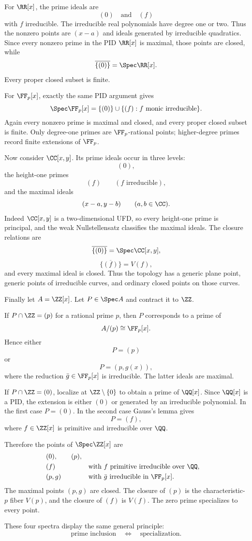 \begin{solution}
For $\RR[x]$, the prime ideals are
\[
(0)
\quad\text{and}\quad
(f)
\]
with $f$ irreducible.  The irreducible real polynomials have degree one or two.  Thus the
nonzero points are $(x-a)$ and ideals generated by irreducible quadratics.  Since every
nonzero prime in the PID $\RR[x]$ is maximal, those points are closed, while
\[
\overline{\{(0)\}}=\Spec\RR[x].
\]
Every proper closed subset is finite.

For $\FF_p[x]$, exactly the same PID argument gives
\[
\Spec\FF_p[x]=\{(0)\}\cup\{(f):f\text{ monic irreducible}\}.
\]
Again every nonzero prime is maximal and closed, and every proper closed subset is finite.
Only degree-one primes are $\FF_p$-rational points; higher-degree primes record finite
extensions of $\FF_p$.

Now consider $\CC[x,y]$.  Its prime ideals occur in three levels:
\[
(0),
\]
the height-one primes
\[
(f)\qquad(f\text{ irreducible}),
\]
and the maximal ideals
\[
(x-a,y-b)\qquad(a,b\in\CC).
\]
Indeed $\CC[x,y]$ is a two-dimensional UFD, so every height-one prime is principal, and the
weak Nullstellensatz classifies the maximal ideals.  The closure relations are
\[
\overline{\{(0)\}}=\Spec\CC[x,y],
\]
\[
\overline{\{(f)\}}=V(f),
\]
and every maximal ideal is closed.  Thus the topology has a generic plane point, generic
points of irreducible curves, and ordinary closed points on those curves.

Finally let $A=\ZZ[x]$.  Let $P\in\Spec A$ and contract it to $\ZZ$.

If $P\cap\ZZ=(p)$ for a rational prime $p$, then $P$ corresponds to a prime of
\[
A/(p)\cong\FF_p[x].
\]
Hence either
\[
P=(p)
\]
or
\[
P=(p,g(x)),
\]
where the reduction $\bar g\in\FF_p[x]$ is irreducible.  The latter ideals are maximal.

If $P\cap\ZZ=(0)$, localize at $\ZZ\setminus\{0\}$ to obtain a prime of $\QQ[x]$.
Since $\QQ[x]$ is a PID, the extension is either $(0)$ or generated by an irreducible
polynomial.  In the first case $P=(0)$.  In the second case Gauss's lemma gives
\[
P=(f),
\]
where $f\in\ZZ[x]$ is primitive and irreducible over $\QQ$.

Therefore the points of $\Spec\ZZ[x]$ are
\[
\begin{aligned}
&(0),\qquad (p),\\
&(f)\quad &&\text{with $f$ primitive irreducible over $\QQ$},\\
&(p,g)\quad &&\text{with $\bar g$ irreducible in $\FF_p[x]$}.
\end{aligned}
\]
The maximal points $(p,g)$ are closed.  The closure of $(p)$ is the characteristic-$p$
fiber $V(p)$, and the closure of $(f)$ is $V(f)$.  The zero prime specializes to every
point.

These four spectra display the same general principle:
\[
\text{prime inclusion}
\quad\Longleftrightarrow\quad
\text{specialization}.
\]
\end{solution}

